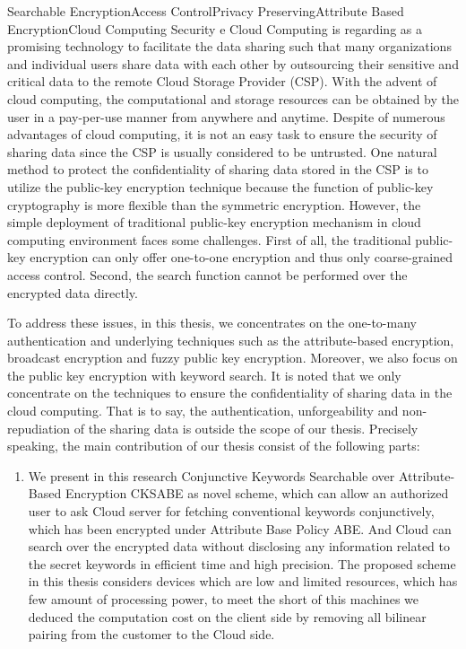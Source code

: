 
\begin{Eabstract}{Searchable Encryption}{Access Control}{Privacy Preserving}{Attribute Based Encryption}{Cloud Computing Security}
 e Cloud Computing is regarding as a promising technology to facilitate the data sharing such that many organizations and individual users share data with each other by outsourcing their sensitive and critical data to the remote Cloud Storage Provider (CSP). With the advent of cloud computing, the computational and storage resources can be obtained by the user in a pay-per-use manner from anywhere and anytime. Despite of numerous advantages of cloud computing, it is not an easy task to ensure the security of sharing data since the CSP is usually considered to be untrusted. One natural method to protect the confidentiality of sharing data stored in the CSP is to utilize the public-key encryption technique because the function of public-key cryptography is more flexible than the symmetric encryption. However, the simple deployment of traditional public-key encryption mechanism in cloud computing environment faces some challenges. First of all, the traditional public-key encryption can only offer one-to-one encryption and thus only coarse-grained access control. Second, the search function cannot be performed over the encrypted data directly.\par
To address these issues, in this thesis, we concentrates on the one-to-many authentication and underlying techniques such as the attribute-based encryption, broadcast encryption and fuzzy public key encryption. Moreover, we also focus on the public key encryption with keyword search. It is noted that we only concentrate on the techniques to ensure the confidentiality of sharing data in the cloud computing. That is to say, the authentication, unforgeability and non-repudiation of the sharing data is outside the scope of our thesis. Precisely speaking, the main contribution of our thesis consist of the following parts:
\begin{enumerate}
	\item We present in this research Conjunctive Keywords Searchable over Attribute-Based Encryption CKSABE as novel scheme, which can allow an authorized user to ask Cloud server for fetching conventional keywords conjunctively, which has been encrypted under Attribute Base Policy ABE. And Cloud can search over the encrypted data without disclosing any information related to the secret keywords in efficient time and high precision. The proposed scheme in this thesis considers devices which are low and limited resources, which has few amount of processing power, to meet the short of this machines we deduced the computation cost on the client side by removing all bilinear pairing from the customer to the Cloud side.

\end{enumerate}
\end{Eabstract}
